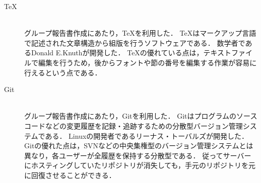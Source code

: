 \documentclass[../report]{subfiles}
\begin{document}
\begin{description}
    \item[TeX] \mbox{} \\
        グループ報告書作成にあたり，TeXを利用した．
        TeXはマークアップ言語で記述された文章構造から組版を行うソフトウェアである．
        数学者であるDonald E.Knuthが開発した．
        TeXの優れている点は，テキストファイルで編集を行うため，後からフォントや節の番号を編集する作業が容易に行えるという点である．
    \item[Git] \mbox{} \\
        グループ報告書作成にあたり，Gitを利用した．
        Gitはプログラムのソースコードなどの変更履歴を記録・追跡するための分散型バージョン管理システムである．
        Linuxの開発者であるリーナス・トーバルズが開発した．
        Gitの優れた点は，SVNなどの中央集権型のバージョン管理システムとは異なり，各ユーザーが全履歴を保持する分散型である．
        従ってサーバーにホスティングしていたリポジトリが消失しても，手元のリポジトリを元に回復させることができる．
\end{description}
\end{document}
